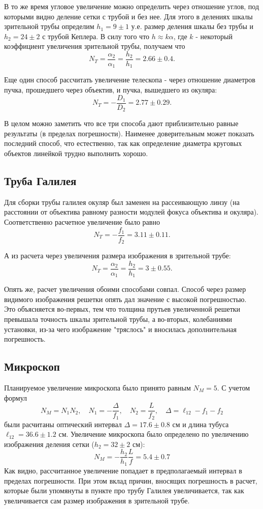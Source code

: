 \documentclass[a4paper, 12pt]{article}
\begin{document}
В то же время угловое увеличение можно определить через отношение углов, под которыми видно деление сетки с трубой и без нее. Для этого в делениях шкалы зрительной трубы определим $h_{1} = 9 \pm 1$ у.е. размер деления шкалы без трубы и $h_{2} = 24 \pm 2$ с трубой Кеплера. В силу того что $h \approx k \alpha$, где $k$ - некоторый коэффициент увеличения зрительной трубы, получаем что $$N_{T}=\frac{\alpha_{2}}{\alpha_{1}}=\frac{h_{2}}{h_{1}}=2.66 \pm 0.4.$$

Еще один способ рассчитать увеличение телескопа - через отношение диаметров пучка, прошедшего через объектив, и пучка, вышедшего из окуляра:
$$N_{T}=-\frac{D_{1}}{D_{2}}=2.77 \pm 0.29.$$

В целом можно заметить что все три способа дают приблизительно равные результаты (в пределах погрешности). Наименее доверительным может показать последний способ, что естественно, так как определение диаметра круговых объектов линейкой трудно выполнить хорошо.

\subsection{Труба Галилея}
Для сборки трубы галилея окуляр был заменен на рассеивающую линзу (на расстоянии от объектива равному разности модулей фокуса объектива и окуляра). Соответственно расчетное увеличение было равно
$$N_{T}=-\frac{f_{1}}{f_{2}}=3.11 \pm 0.11.$$

А из расчета через увеличения размера изображения в зрительной трубе:
$$N_{T}=\frac{\alpha_{2}}{\alpha_{1}}=\frac{h_{2}}{h_{1}}=3 \pm 0.55.$$

Опять же, расчет увеличения обоими способами совпал. Способ через размер видимого изображения решетки опять дал значение с высокой погрешностью. Это объясняется во-первых, тем что толщина прутьев увеличенной решетки превышала точность шкалы зрительной трубы, а во-вторых, колебаниями установки, из-за чего изображение "тряслось" и вносилась дополнительная погрешность.



\subsection{Микроскоп}
Планируемое увеличение микроскопа было принято равным $N_{M} = 5$. С учетом формул
$$
N_{M}=N_{1} N_{2}, \quad N_{1}=-\frac{\Delta}{f_{1}}, \quad N_{2}=\frac{L}{f_{2}}, \quad \Delta=\ell_{12}-f_{1}-f_{2}
$$
были расчитаны оптический интервал $\Delta = 17.6 \pm 0.8$ см и длина тубуса $\ell_{12} = 36.6 \pm 1.2$ см. Увеличение микроскопа было определено по увеличению изображения деления сетки ($h_{2} = 32 \pm 2$ см):
$$
N_{M}=-\frac{h_{2}}{h_{1}} \frac{L}{f} = 5.4 \pm 0.7
$$
Как видно, рассчитанное увеличение попадает в предполагаемый интервал в пределах погрешности. При этом вклад причин, вносящих погрешность в расчет, которые были упомянуты в пункте про трубу Галилея увеличивается, так как увеличивается сам размер изображения в зрительной трубе.
\end{document}
